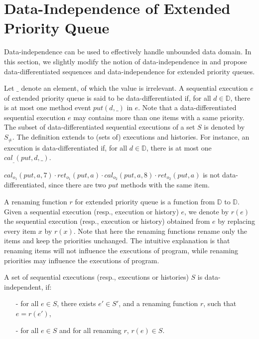 \section{Data-Independence of Extended Priority Queue}
\label{sec:data-independence of extended priority queue}

Data-independence \cite{Wolper:1986} can be used to effectively handle unbounded data domain. In this section, we slightly modify the notion of data-independence in \cite{Wolper:1986} and propose data-differentiated sequences and data-independence for extended priority queues.

Let $\_$ denote an element, of which the value is irrelevant. A sequential execution $e$ of extended priority queue is said to be data-differentiated if, for all $d \in \mathbb{D}$, there is at most one method event $\textit{put}(d,\_)$ in $e$. Note that a data-differentiated sequential execution $e$ may contains more than one items with a same priority. The subset of data-differentiated sequential executions of a set $S$ is denoted by $S_{\neq}$. The definition extends to (sets of) executions and histories. For instance, an execution is data-differentiated if, for all $d \in \mathbb{D}$, there is at most one $\textit{cal}_{\_}(\textit{put},d,\_)$.

\begin{example}\label{example:data-differentiated}
$\textit{cal}_{o_1}(\textit{put},a,7) \cdot \textit{ret}_{o_1}(\textit{put},a) \cdot \textit{cal}_{o_2}(\textit{put},a,8) \cdot \textit{ret}_{o_2}(\textit{put},a)$ is not data-differentiated, since there are two $\textit{put}$ methods with the same item.
\end{example}

A renaming function $r$ for extended priority queue is a function from $\mathbb{D}$ to $\mathbb{D}$. Given a sequential execution (resp., execution or history) $e$, we denote by $r(e)$ the sequential execution (resp., execution or history) obtained from $e$ by replacing every item $x$ by $r(x)$. Note that here the renaming functions rename only the items and keep the priorities unchanged. The intuitive explanation is that renaming items will not influence the executions of program, while renaming priorities may influence the executions of program. 

\begin{definition}\label{def:priority-value data-independence}
A set of sequential executions (resp., executions or histories) $S$ is data-independent, if:
\begin{itemize}
\setlength{\itemsep}{0.5pt}
\item[-] for all $e \in S$, there exists $e' \in S'$, and a renaming function $r$, such that $e=r(e')$,

\item[-] for all $e \in S$ and for all renaming $r$, $r(e) \in S$.
\end{itemize}
\end{definition}

